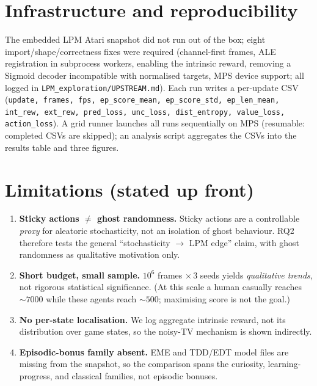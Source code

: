 \documentclass[11pt]{article}
\begin{document}
\section{Infrastructure and reproducibility}
The embedded LPM Atari snapshot did not run out of the box; eight import/shape/correctness fixes
were required (channel-first frames, ALE registration in subprocess workers, enabling the intrinsic
reward, removing a Sigmoid decoder incompatible with normalised targets, MPS device support; all
logged in \texttt{LPM\_exploration/UPSTREAM.md}). Each run writes a per-update CSV
(\texttt{update, frames, fps, ep\_score\_mean, ep\_score\_std, ep\_len\_mean, int\_rew, ext\_rew,
pred\_loss, unc\_loss, dist\_entropy, value\_loss, action\_loss}). A grid runner launches all runs
sequentially on MPS (resumable: completed CSVs are skipped); an analysis script aggregates the CSVs
into the results table and three figures.

\section{Limitations (stated up front)}
\begin{enumerate}[leftmargin=1.6em]
  \item \textbf{Sticky actions \(\neq\) ghost randomness.} Sticky actions are a controllable
  \emph{proxy} for aleatoric stochasticity, not an isolation of ghost behaviour. RQ2 therefore tests
  the general ``stochasticity \(\to\) LPM edge'' claim, with ghost randomness as qualitative
  motivation only.
  \item \textbf{Short budget, small sample.} \(10^{6}\) frames \(\times\,3\) seeds yields
  \emph{qualitative trends}, not rigorous statistical significance. (At this scale a human casually
  reaches \(\sim\!7000\) while these agents reach \(\sim\!500\); maximising score is not the goal.)
  \item \textbf{No per-state localisation.} We log aggregate intrinsic reward, not its distribution
  over game states, so the noisy-TV mechanism is shown indirectly.
  \item \textbf{Episodic-bonus family absent.} EME and TDD/EDT model files are missing from the
  snapshot, so the comparison spans the curiosity, learning-progress, and classical families, not
  episodic bonuses.
\end{enumerate}
\end{document}
